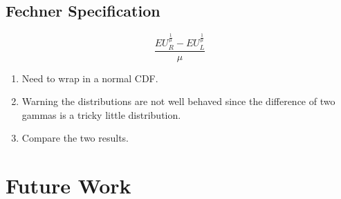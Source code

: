 \documentclass{article}
\begin{document}
  \subsection{Fechner Specification}

  
  
\begin{equation}
\frac{EU_R^{\frac{1}{\mu}}-EU_L^{\frac{1}{\mu}}}{\mu}
\end{equation}


    \begin{enumerate}
      \item  Need to wrap in a normal CDF.
      \item Warning the distributions are not well behaved since the difference of two gammas is a tricky little distribution.
      \item Compare the two results.
    \end{enumerate}


\section{Future Work}




\nocite{*}


\end{document}
